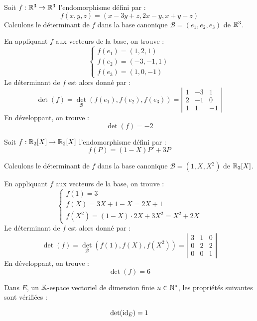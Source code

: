 \documentclass[12pt, a4paper]{report}
\begin{document}
\begin{example}[Dans $\R^3$]
    Soit $f : \mathbb{R}^3 \to \mathbb{R}^3$ l'endomorphisme défini par :
    $$f(x,y,z) = (x-3y+z, 2x-y, x+y-z)$$
    Calculons le déterminant de $f$ dans la base canonique $\mathcal{B} = (e_1, e_2, e_3)$ de $\R^3$.
    
    En appliquant $f$ aux vecteurs de la base, on trouve :
    $$\begin{cases}
        f(e_1) = (1,2,1) \\
        f(e_2) = (-3,-1,1) \\
        f(e_3) = (1,0,-1)
    \end{cases}$$
    Le déterminant de $f$ est alors donné par :
    $$\det(f) = \det_{\mathcal{B}}(f(e_1), f(e_2), f(e_3)) = \left|\begin{matrix} 1 & -3 & 1 \\ 2 & -1 & 0 \\ 1 & 1 & -1 \end{matrix}\right|$$
    En développant, on trouve :
    $$\det(f) = -2$$
\end{example}

\begin{example}
    Soit $f : \mathbb{R}_2[X] \to \mathbb{R}_2[X]$ l'endomorphisme défini par :
    $$f(P) = (1-X)P' + 3P$$

    Calculons le déterminant de $f$ dans la base canonique $\mathcal{B} = (1, X, X^2)$ de $\mathbb{R}_2[X]$.

    En appliquant $f$ aux vecteurs de la base, on trouve :
    $$\begin{cases}
        f(1) = 3 \\
        f(X) = 3X + 1 - X = 2X + 1 \\
        f(X^2) = (1-X) \cdot 2X + 3X^2 = X^2 + 2X
    \end{cases}$$
    Le déterminant de $f$ est alors donné par :
    $$\det(f) = \det_{\mathcal{B}}(f(1), f(X), f(X^2)) = \left|\begin{matrix} 3 & 1 & 0 \\ 0 & 2 & 2 \\ 0 & 0 & 1 \end{matrix}\right|$$
    En développant, on trouve :
    $$\det(f) = 6$$
\end{example}

Dans $E$, un $\mathbb{K}$-espace vectoriel de dimension finie $n \in \mathbb{N}^*$, les propriétés suivantes sont vérifiées :

\begin{property}
    $$\det(\mathrm{id}_E) = 1$$
\end{property}
\end{document}
